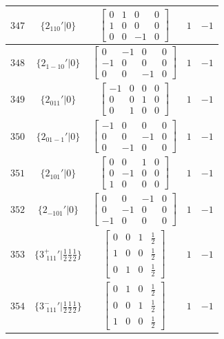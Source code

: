\documentclass[fleqn,8pt]{jsarticle}
\begin{document}
\begin{longtable}{ccccc}
$ 347 $ & $ \{2{}_{110}{}'|0\} $ & $ \begin{bmatrix} 0 & 1 & 0 & 0 \\ 1 & 0 & 0 & 0 \\ 0 & 0 & -1 & 0 \end{bmatrix} $ & $ 1 $ & $ -1 $ \\ \hline
$ 348 $ & $ \{2{}_{1-10}{}'|0\} $ & $ \begin{bmatrix} 0 & -1 & 0 & 0 \\ -1 & 0 & 0 & 0 \\ 0 & 0 & -1 & 0 \end{bmatrix} $ & $ 1 $ & $ -1 $ \\ \hline
$ 349 $ & $ \{2{}_{011}{}'|0\} $ & $ \begin{bmatrix} -1 & 0 & 0 & 0 \\ 0 & 0 & 1 & 0 \\ 0 & 1 & 0 & 0 \end{bmatrix} $ & $ 1 $ & $ -1 $ \\ \hline
$ 350 $ & $ \{2{}_{01-1}{}'|0\} $ & $ \begin{bmatrix} -1 & 0 & 0 & 0 \\ 0 & 0 & -1 & 0 \\ 0 & -1 & 0 & 0 \end{bmatrix} $ & $ 1 $ & $ -1 $ \\ \hline
$ 351 $ & $ \{2{}_{101}{}'|0\} $ & $ \begin{bmatrix} 0 & 0 & 1 & 0 \\ 0 & -1 & 0 & 0 \\ 1 & 0 & 0 & 0 \end{bmatrix} $ & $ 1 $ & $ -1 $ \\ \hline
$ 352 $ & $ \{2{}_{-101}{}'|0\} $ & $ \begin{bmatrix} 0 & 0 & -1 & 0 \\ 0 & -1 & 0 & 0 \\ -1 & 0 & 0 & 0 \end{bmatrix} $ & $ 1 $ & $ -1 $ \\ \hline
$ 353 $ & $ \{3^{+}_{\,\,111}{}'|\frac{1}{2} \frac{1}{2} \frac{1}{2}\} $ & $ \begin{bmatrix} 0 & 0 & 1 & \frac{1}{2} \\ 1 & 0 & 0 & \frac{1}{2} \\ 0 & 1 & 0 & \frac{1}{2} \end{bmatrix} $ & $ 1 $ & $ -1 $ \\ \hline
$ 354 $ & $ \{3^{-}_{\,\,111}{}'|\frac{1}{2} \frac{1}{2} \frac{1}{2}\} $ & $ \begin{bmatrix} 0 & 1 & 0 & \frac{1}{2} \\ 0 & 0 & 1 & \frac{1}{2} \\ 1 & 0 & 0 & \frac{1}{2} \end{bmatrix} $ & $ 1 $ & $ -1 $ \\ \hline

\end{longtable}
\end{document}
